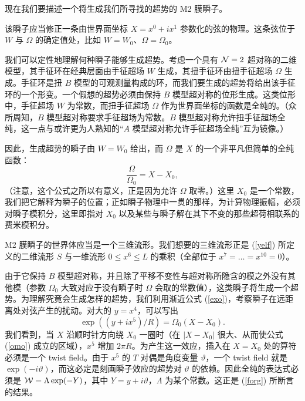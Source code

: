 现在我们要描述一个将生成我们所寻找的超势的 M2 膜瞬子。

该瞬子应当修正一条由世界面坐标 $X=x^0+ix^1$ 参数化的弦的物理。这条弦位于 $W$ 与 $\Omega$ 的确定值处，比如 $W=W_0$、$\Omega=\Omega_0$。

我们可以定性地理解何种瞬子能够生成超势。考虑一个具有 ${\mathcal N}=2$ 超对称的二维模型，其手征环在经典层面由手征超场 $W$ 生成，其扭手征环由扭手征超场 $\Omega$ 生成。手征环是扭 $B$ 模型的可观测量构成的环，而我们要生成的超势将给出该手征环的一个形变。一个假想的超势必须由保持 $B$ 模型超对称的位形生成。这类位形中，手征超场 $W$ 为常数，而扭手征超场 $\Omega$ 作为世界面坐标的函数是全纯的。（众所周知，$B$ 模型超对称要求手征超场为常数。$B$ 模型超对称允许扭手征超场全纯，这一点与或许更为人熟知的“$A$ 模型超对称允许手征超场全纯”互为镜像。）

因此，生成超势的瞬子由 $W=W_0$ 给出，而 $\Omega$ 是 $X$ 的一个非平凡但简单的全纯函数：
\begin{equation}\label{yelf}\frac{\Omega}{\Omega_0}=X-X_0,\end{equation}
（注意，这个公式之所以有意义，正是因为允许 $\Omega$ 取零。）这里 $X_0$ 是一个常数，我们把它解释为瞬子的位置；正如瞬子物理中一贯的那样，为计算物理振幅，必须对瞬子模积分，这里即指对 $X_0$ 以及某些与瞬子解在其下不变的那些超荷相联系的费米模积分。

M2 膜瞬子的世界体应当是一个三维流形。我们想要的三维流形正是 (\ref{yelf}) 所定义的二维流形 $S$ 与一维流形 $0\leq x^6\leq L$ 的乘积（全部位于 $x^7=\dots=x^{10}=0$）。

由于它保持 $B$ 模型超对称，并且除了平移不变性与超对称所隐含的模之外没有其他模（参数 $\Omega_0$ 大致对应于没有瞬子时 $\Omega$ 会取的常数值），这类瞬子将生成一个超势。为理解究竟会生成怎样的超势，我们利用渐近公式 (\ref{exo})，考察瞬子在远距离处对弦产生的扰动。对大的 $y=x^4$，可以写出
\begin{equation}\label{omo}\exp((y+ix^5)/R)=\Omega_0(X-X_0).\end{equation}
我们看到，当 $X$ 沿顺时针方向绕 $X_0$ 一圈时（在 $|X-X_0|$ 很大、从而使公式 (\ref{omo}) 成立的区域），$x^5$ 增加 $2\pi R$。为产生这一效应，插入在 $X=X_0$ 处的算符必须是一个 twist field。由于 $x^5$ 的 $T$ 对偶是角度变量 $\vartheta$，一个 twist field 就是 $\exp(-i\vartheta)$，而这必定是刻画瞬子效应的超势对 $\vartheta$ 的依赖。因此全纯的表达式必须是 ${\mathcal W}=\Lambda \exp(-Y)$，其中 $Y=y+i\vartheta$，$\Lambda$ 为某个常数。这正是 (\ref{forg}) 所断言的结果。


